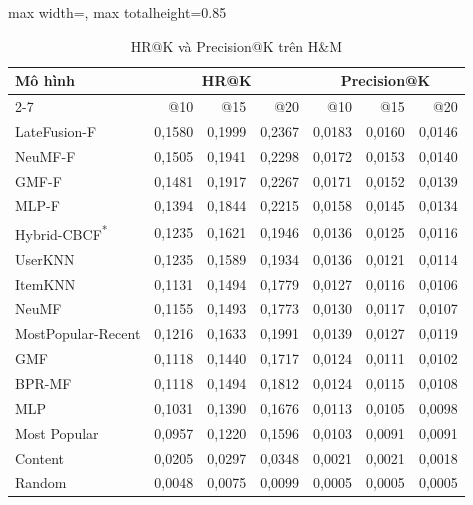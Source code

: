 \begin{table}[H]
    \centering\small\setlength{\tabcolsep}{4pt}
    \caption{HR@K và Precision@K trên H\&M}
    \label{tab:v2k2}
    \begin{adjustbox}{max width=\textwidth, max totalheight=0.85\textheight}
    \begin{tabular}{|l|r|r|r|r|r|r|}
        \hline
        \multirow{2}{*}{Mô hình} & \multicolumn{3}{c|}{HR@K} & \multicolumn{3}{c|}{Precision@K} \\ \cline{2-7}
         & @10 & @15 & @20 & @10 & @15 & @20 \\ \hline
        LateFusion-F & 0{,}1580 & 0{,}1999 & 0{,}2367 & 0{,}0183 & 0{,}0160 & 0{,}0146 \\ \hline
        NeuMF-F & 0{,}1505 & 0{,}1941 & 0{,}2298 & 0{,}0172 & 0{,}0153 & 0{,}0140 \\ \hline
        GMF-F & 0{,}1481 & 0{,}1917 & 0{,}2267 & 0{,}0171 & 0{,}0152 & 0{,}0139 \\ \hline
        MLP-F & 0{,}1394 & 0{,}1844 & 0{,}2215 & 0{,}0158 & 0{,}0145 & 0{,}0134 \\ \hline
        Hybrid-CBCF\textsuperscript{*} & 0{,}1235 & 0{,}1621 & 0{,}1946 & 0{,}0136 & 0{,}0125 & 0{,}0116 \\ \hline
        UserKNN & 0{,}1235 & 0{,}1589 & 0{,}1934 & 0{,}0136 & 0{,}0121 & 0{,}0114 \\ \hline
        ItemKNN & 0{,}1131 & 0{,}1494 & 0{,}1779 & 0{,}0127 & 0{,}0116 & 0{,}0106 \\ \hline
        NeuMF & 0{,}1155 & 0{,}1493 & 0{,}1773 & 0{,}0130 & 0{,}0117 & 0{,}0107 \\ \hline
        MostPopular-Recent & 0{,}1216 & 0{,}1633 & 0{,}1991 & 0{,}0139 & 0{,}0127 & 0{,}0119 \\ \hline
        GMF & 0{,}1118 & 0{,}1440 & 0{,}1717 & 0{,}0124 & 0{,}0111 & 0{,}0102 \\ \hline
        BPR-MF & 0{,}1118 & 0{,}1494 & 0{,}1812 & 0{,}0124 & 0{,}0115 & 0{,}0108 \\ \hline
        MLP & 0{,}1031 & 0{,}1390 & 0{,}1676 & 0{,}0113 & 0{,}0105 & 0{,}0098 \\ \hline
        Most Popular & 0{,}0957 & 0{,}1220 & 0{,}1596 & 0{,}0103 & 0{,}0091 & 0{,}0091 \\ \hline
        Content & 0{,}0205 & 0{,}0297 & 0{,}0348 & 0{,}0021 & 0{,}0021 & 0{,}0018 \\ \hline
        Random & 0{,}0048 & 0{,}0075 & 0{,}0099 & 0{,}0005 & 0{,}0005 & 0{,}0005 \\ \hline
    \end{tabular}
    \end{adjustbox}
\end{table}
